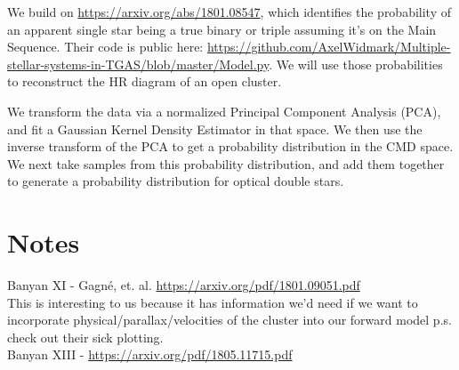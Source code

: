 \documentclass{article}
\begin{document}
We build on \url{https://arxiv.org/abs/1801.08547}, which identifies the probability of an apparent single star being a true binary or triple assuming it's on the Main Sequence.
Their code is public here: \url{https://github.com/AxelWidmark/Multiple-stellar-systems-in-TGAS/blob/master/Model.py}.
We will use those probabilities to reconstruct the HR diagram of an open cluster.

We transform the data via a normalized Principal Component Analysis (PCA), and fit a Gaussian Kernel Density Estimator in that space. We then use the inverse transform of the PCA to get a probability distribution in the CMD space. We next take samples from this probability distribution, and add them together to generate a probability distribution for optical double stars.

\section{Notes}
Banyan XI - Gagné, et. al. \url{https://arxiv.org/pdf/1801.09051.pdf}\\ This is interesting to us because it has information we'd need if we want to incorporate physical/parallax/velocities of the cluster into our forward model p.s. check out their sick plotting.\\
Banyan XIII - \url{https://arxiv.org/pdf/1805.11715.pdf}
\end{document}
